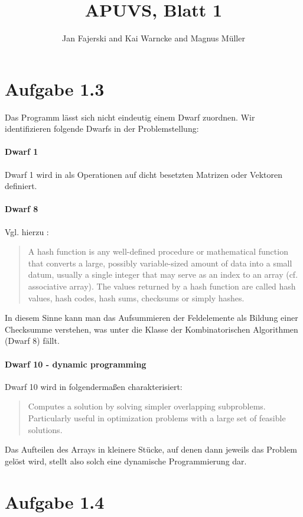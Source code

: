 \documentclass[a4paper,
               12pt,
               BCOR12mm,
               ]{scrartcl}
\title{APUVS, Blatt 1}
\author{Jan Fajerski and Kai Warncke and Magnus Müller}
\begin{document}
\maketitle  
  \section*{Aufgabe 1.3}
		Das Programm lässt sich nicht eindeutig einem Dwarf zuordnen. Wir identifizieren folgende
		Dwarfs in der Problemstellung:
		\paragraph{Dwarf 1}
		    Dwarf 1 wird in \cite[S.11]{eecs} als Operationen auf dicht besetzten Matrizen oder Vektoren definiert.

		\paragraph{Dwarf 8}
		Vgl. hierzu \cite{wiki_hash}:
		\begin{quotation}
			A hash function is any well-defined procedure or mathematical function that converts
			a large, possibly variable-sized amount of data into a small datum, usually a single
			integer that may serve as an index to an array (cf. associative array). The values
			returned by a hash function are called hash values, hash codes, hash sums, checksums
			or simply hashes.
		\end{quotation}
		In diesem Sinne kann man das Aufsummieren der Feldelemente als Bildung einer
		Checksumme verstehen, was unter die Klasse der Kombinatorischen Algorithmen (Dwarf 8)
		fällt.

		\paragraph{Dwarf 10 - dynamic programming}
		Dwarf 10 wird in \cite[S. 16]{eecs} folgendermaßen charakterisiert:
		\begin{quotation}
			Computes a solution by solving simpler overlapping subproblems.
			Particularly useful in optimization problems with a large set of feasible
			solutions.
		\end{quotation}
		Das Aufteilen des Arrays in kleinere Stücke, auf denen dann jeweils das Problem gelöst
		wird, stellt also solch eine dynamische Programmierung dar.

  \section*{Aufgabe 1.4}
\end{document}
